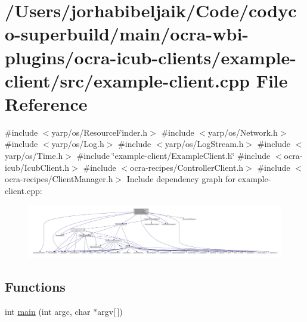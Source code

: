 \hypertarget{example-client_8cpp}{}\section{/\+Users/jorhabibeljaik/\+Code/codyco-\/superbuild/main/ocra-\/wbi-\/plugins/ocra-\/icub-\/clients/example-\/client/src/example-\/client.cpp File Reference}
\label{example-client_8cpp}
{\ttfamily \#include $<$yarp/os/\+Resource\+Finder.\+h$>$}\newline
{\ttfamily \#include $<$yarp/os/\+Network.\+h$>$}\newline
{\ttfamily \#include $<$yarp/os/\+Log.\+h$>$}\newline
{\ttfamily \#include $<$yarp/os/\+Log\+Stream.\+h$>$}\newline
{\ttfamily \#include $<$yarp/os/\+Time.\+h$>$}\newline
{\ttfamily \#include \char`\"{}example-\/client/\+Example\+Client.\+h\char`\"{}}\newline
{\ttfamily \#include $<$ocra-\/icub/\+Icub\+Client.\+h$>$}\newline
{\ttfamily \#include $<$ocra-\/recipes/\+Controller\+Client.\+h$>$}\newline
{\ttfamily \#include $<$ocra-\/recipes/\+Client\+Manager.\+h$>$}\newline
Include dependency graph for example-\/client.cpp\+:\nopagebreak
\begin{figure}[H]
\begin{center}
\leavevmode
\includegraphics[width=350pt]{example-client_8cpp__incl}
\end{center}
\end{figure}
\subsection*{Functions}
\begin{DoxyCompactItemize}
\item 
int \hyperlink{example-client_8cpp_a0ddf1224851353fc92bfbff6f499fa97}{main} (int argc, char $\ast$argv\mbox{[}$\,$\mbox{]})
\end{DoxyCompactItemize}


